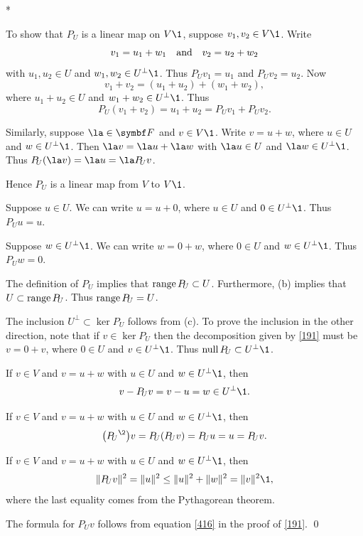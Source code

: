 \proof
\begin{subtheorem}*
\item
To show that $P_{\!U}$ is a linear map on $V\1$, suppose $v_1, v_2 \in V\1$. Write
\[
v_1 = u_1 + w_1 \quad \text{and} \quad v_2 = u_2 + w_2
\]
with $u_1, u_2 \in U$ and $w_1, w_2 \in U^\perp\1$. Thus $P_{\!U} v_1 = u_1$ and $P_{\!U} v_2 = u_2$. Now
\[
v_1 + v_2 = (u_1 + u_2) + (w_1 + w_2),
\]
where $u_1 + u_2 \in U$ and $w_1 + w_2 \in U^\perp\1$. Thus
\[
P_{\!U}(v_1 + v_2) = u_1 + u_2 = P_{\!U} v_1 + P_{\!U} v_2.
\]

Similarly, suppose $\la \in \F{}$ and $v \in V\1$. Write $v = u + w$, where $u \in U$ and $w \in U^\perp\1$. Then $\la v = \la u + \la w$ with $\la u \in U$ and $\la w \in U^\perp\1$. Thus $P_{\!U}(\la v) = \la u = \la P_{\!U}v$.

Hence $P_{\!U}$ is a linear map from $V$ to $V\1$.

\item
Suppose $u \in U$. We can write $u = u + 0$, where $u \in U$ and $0 \in U^\perp\1$. Thus $P_{\!U}u = u$.

\item
Suppose $w \in U^\perp\1$. We can write $w = 0 + w$, where $0 \in U$ and $w \in U^\perp\1$. Thus $P_{\!U}w = 0$.

\item
The definition of $P_{\!U}$ implies that $\operatorname{range} P_{\!U} \subset U$. Furthermore, (b) implies that $U \subset \operatorname{range} P_{\!U}$. Thus $\operatorname{range} P_{\!U} = U$.

\item
The inclusion $U^\perp \subset \ker P_{\!U}$ follows from (c). To prove the inclusion in the other direction, note that if $v \in \ker P_{\!U}$ then the decomposition given by \ref{191} must be $v = 0 + v$, where $0 \in U$ and $v \in U^\perp\1$. Thus $\ker P_{\!U} \subset U^\perp\1$.

\item
If $v \in V$ and $v = u + w$ with $u \in U$ and $w \in U^\perp\1$, then
\[
v - P_{\!U}v = v - u = w \in U^\perp\1.
\]

\item
If $v \in V$ and $v = u + w$ with $u \in U$ and $w \in U^\perp\1$, then
\[
\paren[\big]{{P_{\!U}}^{\2}}v = P_{\!U}(P_{\!U} v) = P_{\!U} u = u = P_{\!U}v.
\]

\item
If $v \in V$ and $v = u + w$ with $u \in U$ and $w \in U^\perp\1$, then
\[
\|P_{\!U} v\|^2 = \|u\|^2 \le \|u\|^2 + \|w\|^2 = \|v\|^2\1,
\]
where the last equality comes from the Pythagorean theorem.

\item
The formula for $P_{\!U} v$ follows from equation \ref{416} in the proof of \ref{191}.
\qed
\end{subtheorem}

